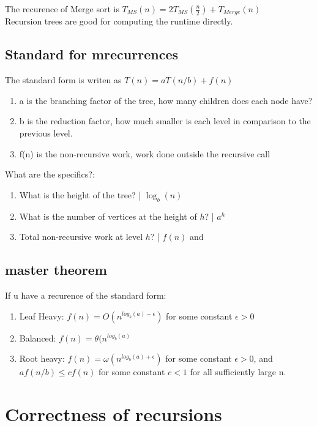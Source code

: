 \documentclass{article}
\begin{document}
The recurence of Merge sort is $T_{MS} (n) = 2T_{MS} (\frac{n}{2}) + T_{Merge} (n)$\\

Recursion trees are good for computing the runtime directly.\\

\subsection{Standard for mrecurrences}
The standard form is writen as $T(n) = aT(n/b) + f(n)$\\
\begin{enumerate}
    \item a is the branching factor of the tree, how many children does each node have? 
    \item b is the reduction factor, how much smaller is each level in comparison to the previous level.
    \item f(n) is the non-recursive work, work done outside the recursive call
\end{enumerate}
What are the specifics?:
\begin{enumerate}
    \item What is the height of the tree? | $\log_b(n)$
    \item What is the number of vertices at the height of $h$? | $a ^h$
    \item Total non-recursive work at level $h$? | $f(n)$ and 
\end{enumerate}
\subsection{master theorem}
If u have a recurence of the standard form:
\begin{enumerate}
    \item Leaf Heavy: $f(n) = O(n^{log_b(a)-\epsilon})$ for some constant $\epsilon > 0$
    \item Balanced: $f(n) = \theta(n^{log_b(a)}$
    \item Root heavy: $f(n) = \omega(n^{log_b(a) + \epsilon})$ for some constant $\epsilon > 0$, and $af(n/b) \leq cf(n)$ for some constant $c < 1$ for all sufficiently large n.
\end{enumerate}

\section{Correctness of recursions}
\end{document}

